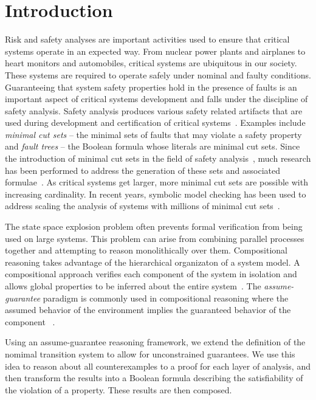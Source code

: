 \section{Introduction}
\label{sec:intro}

Risk and safety analyses are important activities used to ensure that critical systems operate in an expected way. From nuclear power plants and airplanes to heart monitors and automobiles, critical systems are ubiquitous in our society. These systems are required to operate safely under nominal and faulty conditions. Guaranteeing that system safety properties hold in the presence of faults is an important aspect of critical systems development and falls under the discipline of safety analysis. Safety analysis produces various safety related artifacts that are used during development and certification of critical systems~\cite{SAE:ARP4761,SAE:ARP4754A}. Examples include {\em minimal cut sets} -- the minimal sets of faults that may violate a safety property and {\em fault trees} -- the Boolean formula whose literals are minimal cut sets. Since the introduction of minimal cut sets in the field of safety analysis~\cite{vesely1981fault}, much research has been performed to address the generation of these sets and associated formulae~\cite{fta:survey,rauzy1993new,historyFTA,Bozzano:2010:DSA:1951720,rausand2003system}. As critical systems get larger, more minimal cut sets are possible with increasing cardinality. In recent years, symbolic model checking has been used to address scaling the analysis of systems with millions of minimal cut sets~\cite{bieber2002combination,schafer2003combining,fta:survey,contractBasedDesign,symbFTA,DBLP:conf/cav/BozzanoCPJKPRT15}. 

The state space explosion problem often prevents formal verification from being used on large systems. This problem can arise from combining parallel processes together and attempting to reason monolithically over them. Compositional reasoning takes advantage of the hierarchical organizaton of a system model. A compositional approach verifies each component of the system in isolation and allows global properties to be inferred about the entire system~\cite{berezin1997compositional}. The {\em assume-guarantee} paradigm is commonly used in compositional reasoning where the assumed behavior of the environment implies the guaranteed behavior of the component ~\cite{NFM2012:CoGaMiWhLaLu}.

Using an assume-guarantee reasoning framework, we extend the definition of the nomimal transition system to allow for unconstrained guarantees. We use this idea to reason about all counterexamples to a proof for each layer of analysis, and then transform the results into a Boolean formula describing the satisfiability of the violation of a property. These results are then composed. 

